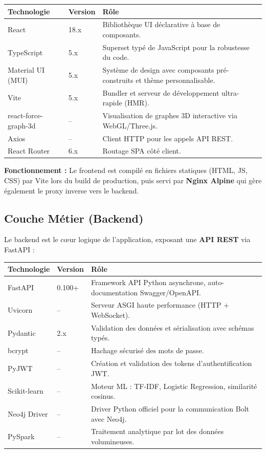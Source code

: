 \documentclass[12pt,a4paper]{article}
\begin{document}
\begin{longtable}{|p{3.5cm}|p{2.5cm}|p{7.5cm}|}
\hline
\rowcolor{bleu!15}
\textbf{Technologie} & \textbf{Version} & \textbf{Rôle} \\
\hline
React & 18.x & Bibliothèque UI déclarative à base de composants. \\
\hline
TypeScript & 5.x & Superset typé de JavaScript pour la robustesse du code. \\
\hline
Material UI (MUI) & 5.x & Système de design avec composants pré-construits et thème personnalisable. \\
\hline
Vite & 5.x & Bundler et serveur de développement ultra-rapide (HMR). \\
\hline
react-force-graph-3d & -- & Visualisation de graphes 3D interactive via WebGL/Three.js. \\
\hline
Axios & -- & Client HTTP pour les appels API REST. \\
\hline
React Router & 6.x & Routage SPA côté client. \\
\hline
\end{longtable}

\textbf{Fonctionnement :} Le frontend est compilé en fichiers statiques (HTML, JS, CSS) par Vite lors du build de production, puis servi par \textbf{Nginx Alpine} qui gère également le proxy inverse vers le backend.

\subsection{Couche Métier (Backend)}

Le backend est le cœur logique de l'application, exposant une \textbf{API REST} via FastAPI :

\begin{longtable}{|p{3.5cm}|p{2.5cm}|p{7.5cm}|}
\hline
\rowcolor{bleu!15}
\textbf{Technologie} & \textbf{Version} & \textbf{Rôle} \\
\hline
FastAPI & 0.100+ & Framework API Python asynchrone, auto-documentation Swagger/OpenAPI. \\
\hline
Uvicorn & -- & Serveur ASGI haute performance (HTTP + WebSocket). \\
\hline
Pydantic & 2.x & Validation des données et sérialisation avec schémas typés. \\
\hline
bcrypt & -- & Hachage sécurisé des mots de passe. \\
\hline
PyJWT & -- & Création et validation des tokens d'authentification JWT. \\
\hline
Scikit-learn & -- & Moteur ML : TF-IDF, Logistic Regression, similarité cosinus. \\
\hline
Neo4j Driver & -- & Driver Python officiel pour la communication Bolt avec Neo4j. \\
\hline
PySpark & -- & Traitement analytique par lot des données volumineuses. \\
\hline
\end{longtable}
\end{document}
